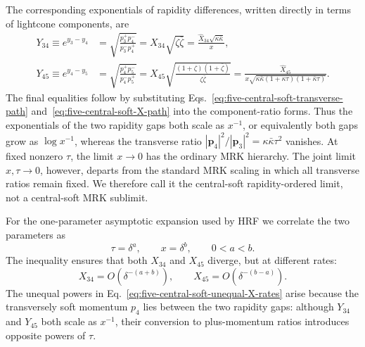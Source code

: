 \documentclass[a4paper,11pt]{article}
\begin{document}
The corresponding exponentials of rapidity differences, written directly in
terms of lightcone components, are
\begin{equation}
 \begin{aligned}
 Y_{34}\equiv e^{y_3-y_4}
 &=\sqrt{\frac{p_3^+p_4^-}{p_3^-p_4^+}}
 =X_{34}\sqrt{\zeta\bar\zeta}
 =\frac{\widehat X_{34}\sqrt{\kappa\bar\kappa}}{x},\\[1mm]
 Y_{45}\equiv e^{y_4-y_5}
 &=\sqrt{\frac{p_4^+p_5^-}{p_4^-p_5^+}}
 =X_{45}\sqrt{\frac{(1+\zeta)(1+\bar\zeta)}
                         {\zeta\bar\zeta}}
 =\frac{\widehat X_{45}}
 {x\sqrt{\kappa\bar\kappa
 (1+\kappa\tau)(1+\bar\kappa\tau)}}.
 \end{aligned}
 \label{eq:five-central-soft-rapidity-ratios}
\end{equation}
The final equalities follow by substituting
Eqs.~\eqref{eq:five-central-soft-transverse-path}
and~\eqref{eq:five-central-soft-X-path} into the component-ratio forms.
Thus the exponentials of the two rapidity gaps both scale as \(x^{-1}\), or
equivalently both gaps grow as \(\log x^{-1}\), whereas the transverse ratio
\(|\mathbf p_4|^2/|\mathbf p_3|^2
=\kappa\bar\kappa\tau^2\) vanishes.  At fixed nonzero
\(\tau\), the limit \(x\to0\) has the ordinary MRK hierarchy.  The joint
limit \(x,\tau\to0\), however, departs from the standard MRK scaling in which all
transverse ratios remain fixed.  We therefore call it the central-soft
rapidity-ordered limit, not a central-soft MRK sublimit.

For the one-parameter asymptotic expansion used by HRF we correlate the two
parameters as
\begin{equation}
 \tau=\delta^a,\qquad x=\delta^b,\qquad 0<a<b.
 \label{eq:five-central-soft-correlated-rates}
\end{equation}
The inequality ensures that both \(X_{34}\) and \(X_{45}\) diverge, but at
different rates:
\begin{equation}
 X_{34}=O(\delta^{-(a+b)}),\qquad
 X_{45}=O(\delta^{-(b-a)}).
 \label{eq:five-central-soft-unequal-X-rates}
\end{equation}
The unequal powers in Eq.~\eqref{eq:five-central-soft-unequal-X-rates} arise
because the transversely soft momentum \(p_4\) lies between the two rapidity
gaps: although \(Y_{34}\) and \(Y_{45}\) both scale as \(x^{-1}\), their
conversion to plus-momentum ratios introduces opposite powers of \(\tau\).
\end{document}
